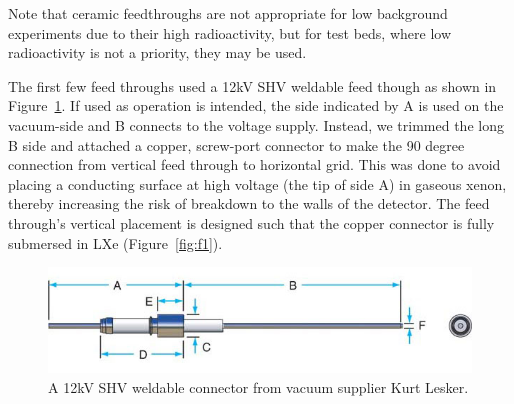 Note that ceramic feedthroughs are not appropriate for low background experiments due to their high radioactivity, but for test beds, where low radioactivity is not a priority, they may be used.

The first few feed throughs used a 12kV \ac{SHV} weldable feed though as shown in Figure~\ref{fig:12kV-SHV}. If used as operation is intended, the side indicated by A is used on the vacuum-side and B connects to the voltage supply. Instead, we trimmed the long B side and attached a copper, screw-port connector to make the 90 degree connection from vertical feed through to horizontal grid. This was done to avoid placing a conducting surface at high voltage (the tip of side A) in gaseous xenon, thereby increasing the risk of breakdown to the walls of the detector. The feed through's vertical placement is designed such that the copper connector is fully submersed in \ac{LXe} (Figure~\ref{fig:f1}).

 
\begin{figure}[htbp]
\begin{center}
\includegraphics[width=5in]{figures/testbed/12kV-SHV.jpg}
\caption{A 12kV SHV weldable connector from vacuum supplier Kurt Lesker.}
\label{fig:12kV-SHV}
\end{center}
\end{figure}

